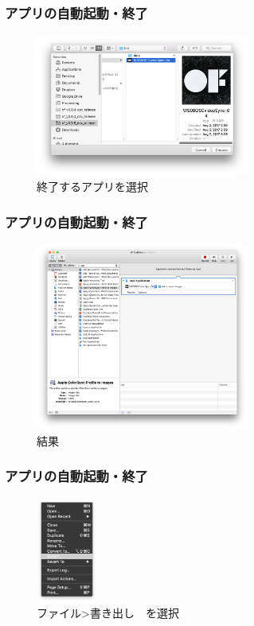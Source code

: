\documentclass[10pt, dvipdfmx]{beamer}
\begin{document}
        \begin{frame}
            \frametitle{アプリの自動起動・終了}
                \begin{figure}[htb]
                    \includegraphics[width=70mm]{images/app-13.png}
                    \caption{終了するアプリを選択}
                    \label{fig:20}
                \end{figure}
        \end{frame}

        \begin{frame}
            \frametitle{アプリの自動起動・終了}
                \begin{figure}[htb]
                    \includegraphics[width=70mm]{images/app-14.png}
                    \caption{結果}
                    \label{fig:21}
                \end{figure}
        \end{frame}

        \begin{frame}
            \frametitle{アプリの自動起動・終了}
                \begin{figure}[htb]
                    \includegraphics[width=20mm]{images/app-15.png}
                    \caption{ファイル>書き出し　を選択}
                    \label{fig:22}
                \end{figure}
        \end{frame}
\end{document}

